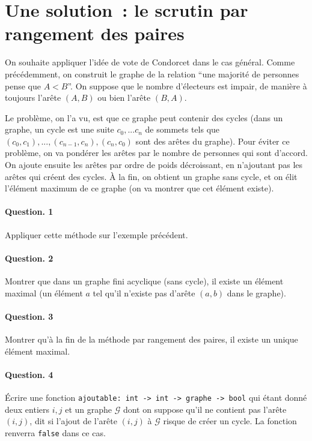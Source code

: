 \documentclass[10pt,a4paper]{article}
\begin{document}
\section{Une solution~: le scrutin par rangement des paires}
On souhaite appliquer l'idée de vote de Condorcet dans le cas général.
Comme précédemment, on construit le graphe de la relation ``une majorité de 
personnes pense que $A<B$''. On suppose que 
le nombre d'électeurs est impair, de manière à toujours l'arête 
$(A,B)$ ou bien l'arête $(B,A)$.

Le problème, on l'a vu, est que ce graphe peut contenir des cycles (dans un 
graphe, un cycle est une suite $c_0,... c_n$ de sommets tels que $(c_0,c_1),...,
(c_{n-1},c_n), (c_n,c_0)$ sont des arêtes du graphe). Pour éviter ce problème, 
on va pondérer les arêtes par le nombre de personnes qui sont d'accord. On 
ajoute ensuite les arêtes par ordre de poids décroissant, en n'ajoutant pas les 
arêtes qui créent des cycles. À la fin, on obtient un graphe sans cycle, et on 
élit l'élément maximum de ce graphe (on va montrer que cet élément existe).

\paragraph{Question. 1\\}
Appliquer cette méthode sur l'exemple précédent.

\paragraph{Question. 2\\}
Montrer que dans un graphe fini acyclique (sans cycle), il existe un élément 
maximal (un élément $a$ tel qu'il n'existe pas d'arête $(a,b)$ dans le graphe).

\paragraph{Question. 3\\}
Montrer qu'à la fin de la méthode par rangement des paires, il existe un unique 
élément maximal.

\paragraph{Question. 4\\}
Écrire une fonction \texttt{ajoutable: int -> int -> graphe -> bool} qui étant 
donné deux entiers $i,j$ et un graphe $\mathcal{G}$ dont on suppose qu'il ne 
contient pas l'arête $(i,j)$, dit si l'ajout de l'arête $(i,j)$ à $\mathcal{G}$ 
risque de créer un cycle. La fonction renverra \texttt{false} dans ce cas.
\end{document}
